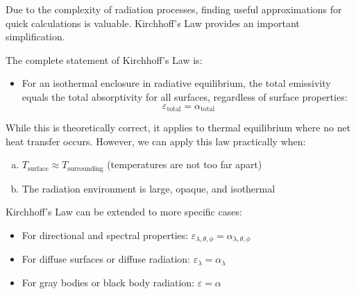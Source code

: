 Due to the complexity of radiation processes, finding useful approximations for quick calculations is valuable. Kirchhoff's Law provides an important simplification.

The complete statement of Kirchhoff's Law is:

\begin{itemize}
    \item For an isothermal enclosure in radiative equilibrium, the total emissivity equals the total absorptivity for all surfaces, regardless of surface properties:
    \[
        \varepsilon_{\mathrm{total}} = \alpha_{\mathrm{total}}
    \]
\end{itemize}

While this is theoretically correct, it applies to thermal equilibrium where no net heat transfer occurs. However, we can apply this law practically when:

\begin{enumerate}[(a)]
    \item $T_{\mathrm{surface}} \approx T_{\mathrm{surrounding}}$ (temperatures are not too far apart)
    \item The radiation environment is large, opaque, and isothermal
\end{enumerate}

Kirchhoff's Law can be extended to more specific cases:
\begin{itemize}
    \item For directional and spectral properties: $\varepsilon_{\lambda,\theta,\phi} = \alpha_{\lambda,\theta,\phi}$
    \item For diffuse surfaces or diffuse radiation: $\varepsilon_{\lambda} = \alpha_{\lambda}$
    \item For gray bodies or black body radiation: $\varepsilon = \alpha$
\end{itemize}

